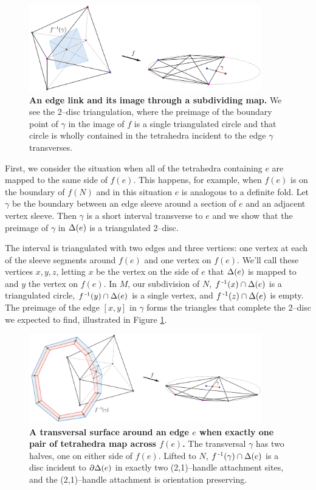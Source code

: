 \begin{figure}[h!]
	\centering
	\includegraphics[width=0.9\textwidth]{figures/pl-definite-fold.png}
	\caption{
		\textbf{An edge link and its image through a subdividing map.}
		We see the 2--disc triangulation, where the preimage of the boundary point of $\gamma$ in the image of $f$ is a single triangulated circle and that circle is wholly contained in the tetrahedra incident to the edge $\gamma$ transverses.
	}
	\label{fig:pl-definite-fold}
\end{figure}

First, we consider the situation when all of the tetrahedra containing $e$ are mapped to the same side of $f(e)$.
This happens, for example, when $f(e)$ is on the boundary of $f(N)$ and in this situation $e$ is analogous to a definite fold.
Let $\gamma$ be the boundary between an edge sleeve around a section of $e$ and an adjacent vertex sleeve.
Then $\gamma$ is a short interval transverse to $e$ and we show that the preimage of $\gamma$ in $\Delta(e)$ is a triangulated 2--disc.

The interval is triangulated with two edges and three vertices: one vertex at each of the sleeve segments around $f(e)$ and one vertex on $f(e)$.
We'll call these vertices $x,y,z$, letting $x$ be the vertex on the side of $e$ that $\Delta(e)$ is mapped to and $y$ the vertex on $f(e)$.
In $M$, our subdivision of $N$, $f^{\,\text{-}1}(x)\cap\Delta(e)$ is a triangulated circle, $f^{\,\text{-}1}(y)\cap\Delta(e)$ is a single vertex, and $f^{\,\text{-}1}(z)\cap\Delta(e)$ is empty.
The preimage of the edge $[x,y]$ in $\gamma$ forms the triangles that complete the 2--disc we expected to find, illustrated in Figure \ref{fig:pl-definite-fold}.

\begin{figure}[h!]
	\centering
	\includegraphics[width=0.9\textwidth]{figures/pl-regular-surface.png}
	\caption{
		\textbf{A transversal surface around an edge $e$ when exactly one pair of tetrahedra map across $f(e)$.}
		The transversal $\gamma$ has two halves, one on either side of $f(e)$.
		Lifted to $N$, $f^{\,\text{-}1}(\gamma)\cap\Delta(e)$ is a disc incident to $\partial\Delta(e)$ in exactly two (2,1)--handle attachment sites, and the (2,1)--handle attachment is orientation preserving.
	}
	\label{fig:pl-regular-surface}
\end{figure}

